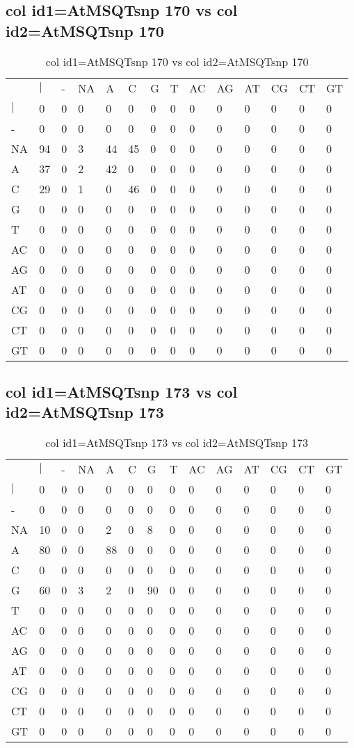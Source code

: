 \subsection{col id1=AtMSQTsnp 170 vs col id2=AtMSQTsnp 170}
\begin{center}
\begin{longtable}{|l|l|l|l|l|l|l|l|l|l|l|l|l|l|}
\caption{col id1=AtMSQTsnp 170 vs col id2=AtMSQTsnp 170} \label{table_dm744}\\
\hline
\\
\hline
&$|$&-&NA&A&C&G&T&AC&AG&AT&CG&CT&GT\\
$|$&0&0&0&0&0&0&0&0&0&0&0&0&0\\
-&0&0&0&0&0&0&0&0&0&0&0&0&0\\
NA&94&0&3&44&45&0&0&0&0&0&0&0&0\\
A&37&0&2&42&0&0&0&0&0&0&0&0&0\\
C&29&0&1&0&46&0&0&0&0&0&0&0&0\\
G&0&0&0&0&0&0&0&0&0&0&0&0&0\\
T&0&0&0&0&0&0&0&0&0&0&0&0&0\\
AC&0&0&0&0&0&0&0&0&0&0&0&0&0\\
AG&0&0&0&0&0&0&0&0&0&0&0&0&0\\
AT&0&0&0&0&0&0&0&0&0&0&0&0&0\\
CG&0&0&0&0&0&0&0&0&0&0&0&0&0\\
CT&0&0&0&0&0&0&0&0&0&0&0&0&0\\
GT&0&0&0&0&0&0&0&0&0&0&0&0&0\\
\hline
\end{longtable}
\end{center}

\subsection{col id1=AtMSQTsnp 173 vs col id2=AtMSQTsnp 173}
\begin{center}
\begin{longtable}{|l|l|l|l|l|l|l|l|l|l|l|l|l|l|}
\caption{col id1=AtMSQTsnp 173 vs col id2=AtMSQTsnp 173} \label{table_dm746}\\
\hline
\\
\hline
&$|$&-&NA&A&C&G&T&AC&AG&AT&CG&CT&GT\\
$|$&0&0&0&0&0&0&0&0&0&0&0&0&0\\
-&0&0&0&0&0&0&0&0&0&0&0&0&0\\
NA&10&0&0&2&0&8&0&0&0&0&0&0&0\\
A&80&0&0&88&0&0&0&0&0&0&0&0&0\\
C&0&0&0&0&0&0&0&0&0&0&0&0&0\\
G&60&0&3&2&0&90&0&0&0&0&0&0&0\\
T&0&0&0&0&0&0&0&0&0&0&0&0&0\\
AC&0&0&0&0&0&0&0&0&0&0&0&0&0\\
AG&0&0&0&0&0&0&0&0&0&0&0&0&0\\
AT&0&0&0&0&0&0&0&0&0&0&0&0&0\\
CG&0&0&0&0&0&0&0&0&0&0&0&0&0\\
CT&0&0&0&0&0&0&0&0&0&0&0&0&0\\
GT&0&0&0&0&0&0&0&0&0&0&0&0&0\\
\hline
\end{longtable}
\end{center}

